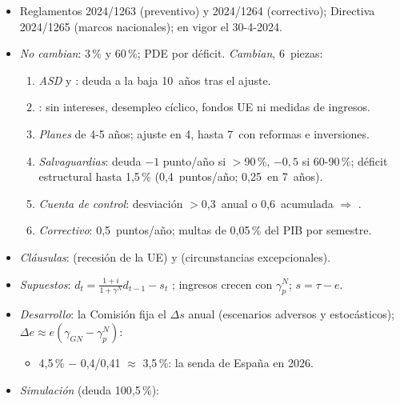 \documentclass{article}
\begin{document}
\begin{columnas}
\begin{itemize}
\item Reglamentos 2024/1263 (preventivo) y 2024/1264 (correctivo); Directiva 2024/1265 (marcos nacionales); en vigor el 30-4-2024.
\item \emph{No cambian}: 3\,\% y 60\,\%; PDE por déficit. \emph{Cambian}, 6~piezas:
  \begin{enumerate}
  \item \emph{ASD} y : deuda a la baja 10~años tras el ajuste.
  \item {}: sin intereses, desempleo cíclico, fondos UE ni medidas de ingresos.
  \item \emph{Planes} de 4-5 años; ajuste en 4, hasta 7~con reformas e inversiones.
  \item \emph{Salvaguardias}: deuda $-1$ punto/año si $>$90\,\%, $-0{,}5$ si 60-90\,\%; déficit estructural hasta 1,5\,\% (0,4~puntos/año; 0,25~en 7~años).
  \item \emph{Cuenta de control}: desviación $>$0,3~anual o 0,6~acumulada $\Rightarrow$ .
  \item \emph{Correctivo}: 0,5~puntos/año; multas de 0,05\,\% del PIB por semestre.
  \end{enumerate}
\item \emph{Cláusulas}:  (recesión de la UE) y  (circunstancias excepcionales).
\end{itemize}
\begin{itemize}
\item \emph{Supuestos}: $d_t=\frac{1+i}{1+\gamma^N}d_{t-1}-s_t$ ; ingresos crecen con $\gamma^N_p$; $s=\tau-e$.
\item \emph{Desarrollo}: la Comisión fija el $\Delta s$ anual (escenarios adversos y estocásticos); $\Delta e\approx e(\gamma_{GN}-\gamma^N_p)$:
  \begin{itemize}
  \item 4,5\,\% $-$ 0,4/0,41 $\approx$ 3,5\,\%: la senda de España en 2026.
  \end{itemize}
\item \emph{Simulación} (deuda 100,5\,\%):
  \begin{itemize}

\end{itemize}
\end{itemize}
\end{columnas}
\end{document}

